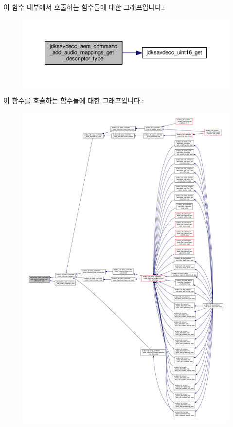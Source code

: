 이 함수 내부에서 호출하는 함수들에 대한 그래프입니다.\+:
\nopagebreak
\begin{figure}[H]
\begin{center}
\leavevmode
\includegraphics[width=350pt]{group__command__add__audio__mappings_gac0f768e0c023e0eeff445a968143ab93_cgraph}
\end{center}
\end{figure}




이 함수를 호출하는 함수들에 대한 그래프입니다.\+:
\nopagebreak
\begin{figure}[H]
\begin{center}
\leavevmode
\includegraphics[width=350pt]{group__command__add__audio__mappings_gac0f768e0c023e0eeff445a968143ab93_icgraph}
\end{center}
\end{figure}


